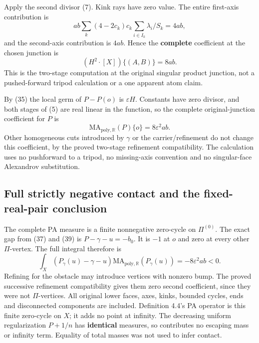 \documentclass[
  11pt,
]{article}
\begin{document}
Apply the second divisor (7). Kink rays have zero value. The entire
first-axis contribution is \[
 ab\sum_k(4-2c_k)c_k\sum_{i\in I_k}\lambda_i/S_k=4ab,
\] and the second-axis contribution is \(4ab\). Hence the
\textbf{complete} coefficient at the chosen junction is \[
                          (H^2\cdot[X])\{(A,B)\}=8ab.              \tag{46}
\] This is the two-stage computation at the original singular product
junction, not a pushed-forward tripod calculation or a one apparent atom
claim.

By (35) the local germ of \(P-P(o)\) is \(\varepsilon H\). Constants
have zero divisor, and both stages of (5) are real linear in the
function, so the complete original-junction coefficient for \(P\) is \[
                    \mathrm{MA}_{\mathrm{poly},\mathbb{R}}(P)\{o\}
                                  =8\varepsilon^2ab.          \tag{47}
\] Other homogeneous cuts introduced by \(\gamma\) or the
carrier/refinement do not change this coefficient, by the proved
two-stage refinement compatibility. The calculation uses no pushforward
to a tripod, no missing-axis convention and no singular-face Alexandrov
substitution.

\subsection{Full strictly negative contact and the fixed-real-pair
conclusion}\label{full-strictly-negative-contact-and-the-fixed-real-pair-conclusion}

The complete PA measure is a finite nonnegative zero-cycle on
\(\Pi^{(0)}\). The exact gap from (37) and (39) is \(P-\gamma-u=-b_0\).
It is \(-1\) at \(o\) and zero at every other \(\Pi\)-vertex. The full
integral therefore is \[
 \int_X(P_\gamma(u)-\gamma-u)
            \mathrm{MA}_{\mathrm{poly},\mathbb{R}}(P_\gamma(u))
                       =-8\varepsilon^2ab<0.                 \tag{48}
\] Refining for the obstacle may introduce vertices with nonzero bump.
The proved successive refinement compatibility gives them zero second
coefficient, since they were not \(\Pi\)-vertices. All original lower
faces, axes, kinks, bounded cycles, ends and disconnected components are
included. Definition 4.4's PA operator is this finite zero-cycle on
\(X\); it adds no point at infinity. The decreasing uniform
regularization \(P+1/n\) has \textbf{identical} measures, so contributes
no escaping mass or infinity term. Equality of total masses was not used
to infer contact.
\end{document}
